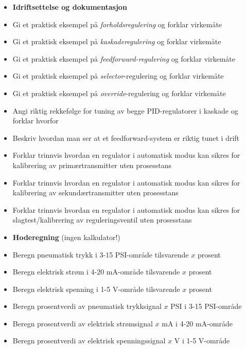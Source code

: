 \begin{itemize}
\item{} {\bf Idriftsettelse og dokumentasjon}
\item{} Gi et praktisk eksempel på {\it forholdsregulering} og forklar virkemåte
\item{} Gi et praktisk eksempel på {\it kaskaderegulering} og forklar virkemåte
\item{} Gi et praktisk eksempel på {\it feedforward-regulering} og forklar virkemåte
\item{} Gi et praktisk eksempel på {\it selector}-regulering og forklar virkemåte
\item{} Gi et praktisk eksempel på {\it override}-regulering og forklar virkemåte
\item{} Angi riktig rekkefølge for tuning av begge PID-regulatorer i kaskade og forklar hvorfor
\item{} Beskriv hvordan man ser at et feedforward-system er riktig tunet i drift
\item{} Forklar trinnvis hvordan en regulator i automatisk modus kan sikres for kalibrering av primærtransmitter uten prosesstans
\item{} Forklar trinnvis hvordan en regulator i automatisk modus kan sikres for kalibrering av sekundærtransmitter uten prosesstans
\item{} Forklar trinnvis hvordan en regulator i automatisk modus kan sikres for slagtest/kalibrering av reguleringsventil uten prosesstans
\end{itemize}

\filbreak

\begin{itemize}
\item{} {\bf Hoderegning} (ingen kalkulator!)
\item{} Beregn pneumatisk trykk i 3-15 PSI-område tilsvarende $x$ prosent
\item{} Beregn elektrisk strøm i 4-20 mA-område tilsvarende $x$ prosent
\item{} Beregn elektrisk spenning i 1-5 V-område tilsvarende $x$ prosent
\item{} Beregn prosentverdi av pneumatisk trykksignal $x$ PSI i 3-15 PSI-område
\item{} Beregn prosentverdi av elektrisk strømsignal $x$ mA i 4-20 mA-område
\item{} Beregn prosentverdi av elektrisk spenningssignal $x$ V i 1-5 V-område
\end{itemize}

